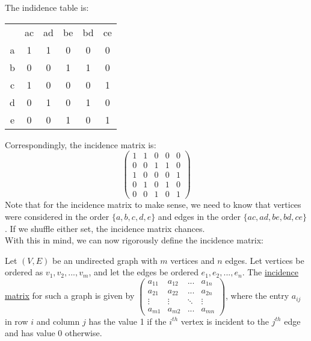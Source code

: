 \documentclass[10pt]{article}
\begin{document}
\begin{description}
\begin{figure}[h!]
		\end{figure}
		\item The indidence table is:
		\begin{table}[h!]
			\centering
			\begin{tabular}{c|ccccc}
				& ac & ad & be & bd & ce \\ \cline{1-6}
				a & 1 & 1 & 0 & 0 & 0 \\
				b & 0 & 0 & 1 & 1 & 0 \\
				c & 1 & 0 & 0 & 0 & 1 \\
				d & 0 & 1 & 0 & 1 & 0 \\
				e & 0 & 0 & 1 & 0 & 1 \\
			\end{tabular}
		\end{table}
		\item Correspondingly, the incidence matrix is:
		\[ \left( \begin{array}{ccccc}
		1 & 1 & 0 & 0 & 0 \\
		0 & 0 & 1 & 1 & 0 \\
		1 & 0 & 0 & 0 & 1 \\
		0 & 1 & 0 & 1 & 0 \\
		0 & 0 & 1 & 0 & 1 \end{array} \right)\] 
		Note that for the incidence matrix to make sense, we need to know that vertices were considered in the order $\{a, b, c, d, e\}$ and edges in the order $\{ac, ad, be, bd, ce\}$. If we shuffle either set, the incidence matrix chances. \\
		With this in mind, we can now rigorously define the incidence matrix:
		\item[Definition:] Let $(V, E)$ be an undirected graph with $m$ vertices and $n$ edges. Let vertices be ordered as $v_1, v_2,..., v_m$, and let the edges be ordered $e_1, e_2, ..., e_n$. The \underline{incidence matrix} for such a graph is given by $\left( \begin{array}{cccc}
			a_{11} & a_{12} & ... & a_{1n} \\
			a_{21} & a_{22} & ... & a_{2n} \\
			\vdots & \vdots & \ddots & \vdots \\
			a_{m1} & a_{m2} & ... & a_{mn} \end{array} \right)$, where the entry $a_{ij}$ in row $i$ and column $j$ has the value 1 if the $i^{th}$ vertex is incident to the $j^{th}$ edge and has value 0 otherwise. \\

\end{description}
\end{document}

